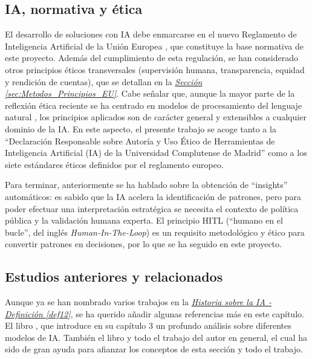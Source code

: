 \subsection{IA, normativa y ética}

El desarrollo de soluciones con IA debe enmarcarse en el nuevo Reglamento de Inteligencia Artificial de la Unión Europea \citep{webRIA2024Europa, omnibus2026Europa}, que constituye la base normativa de este proyecto. Además del cumplimiento de esta regulación, se han considerado otros principios éticos transversales (supervisión humana, transparencia, equidad y rendición de cuentas), que se detallan en la \hyperref[sec:Metodos_Principios_EU]{\textit{Sección \ref*{sec:Metodos_Principios_EU}}}. Cabe señalar que, aunque la mayor parte de la reflexión ética reciente se ha centrado en modelos de procesamiento del lenguaje natural \citep[como los estudios de DeepMind]{gabriel2024ethicsadvancedaiassistants}, los principios aplicados son de carácter general y extensibles a cualquier dominio de la IA. En este aspecto, el presente trabajo se acoge tanto a la ``Declaración Responsable sobre Autoría y Uso Ético de Herramientas de Inteligencia Artificial (IA) de la Universidad Complutense de Madrid'' como a los siete estándares éticos definidos por el reglamento europeo.

Para terminar, anteriormente se ha hablado sobre la obtención de ``insights'' automáticos: es sabido que la IA acelera la identificación de patrones, pero para poder efectuar una interpretación estratégica se necesita el contexto de política pública y la validación humana experta. El principio HITL (``humano en el bucle'', del inglés \textit{Human-In-The-Loop}) \citep{MosqueiraRey2023} es un requisito metodológico y ético para convertir patrones en decisiones, por lo que se ha seguido en este proyecto.

\subsection{Estudios anteriores y relacionados}

Aunque ya se han nombrado varios trabajos en la \hyperref[def12]{\textit{Historia sobre la IA - Definición \ref*{def12}}}, se ha querido añadir algunas referencias más en este capítulo. El libro \citep{Fowdur2021}, que introduce en su capítulo 3 un profundo análisis sobre diferentes modelos de IA. También el libro \citep{Brownlee_2016_MMLA} y todo el trabajo del autor en general, el cual ha sido de gran ayuda para afianzar los conceptos de esta sección y todo el trabajo.

